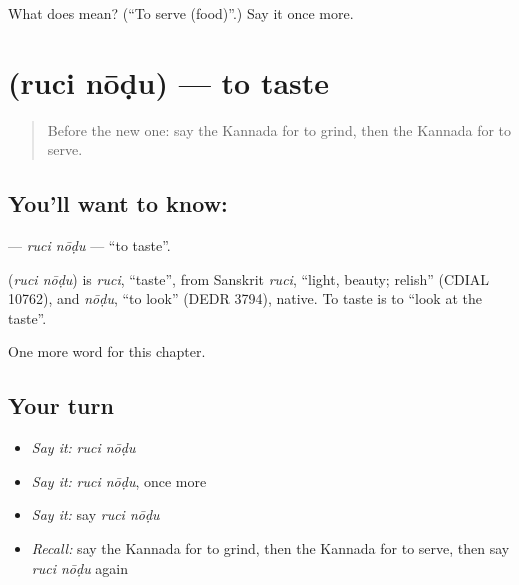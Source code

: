 \begin{tcolorbox}[breakable,colback=teal!4,colframe=teal!35!black,title={Before you move on}]
What does  mean? (\textquotedblleft{}To serve (food)\textquotedblright{}.) Say it once more.
\end{tcolorbox}
\section[\texorpdfstring{\kn{ರುಚಿ} \kn{ನೋಡು} (ruci nōḍu)}{ರುಚಿ ನೋಡು (ruci nōḍu)}]{  (ruci nōḍu) — to taste}

\label{lesson:KA-C159-ruci-nodu}



\begin{quote}
Before the new one: say the Kannada for to grind, then the Kannada for to serve.
\end{quote}

\subsection*{You'll want to know:  }
\textbf{ } — \emph{ruci nōḍu} — \textquotedblleft{}to taste\textquotedblright{}.

\begin{cousinweb}
\textbf{ } (\emph{ruci nōḍu}) is \emph{ruci}, \textquotedblleft{}taste\textquotedblright{}, from Sanskrit \emph{ruci}, \textquotedblleft{}light, beauty; relish\textquotedblright{} (CDIAL 10762), and \emph{nōḍu}, \textquotedblleft{}to look\textquotedblright{} (DEDR 3794), native. To taste is to \textquotedblleft{}look at the taste\textquotedblright{}.
\end{cousinweb}

\begin{grammarlens}[title={What you've built}]
One more word for this chapter.
\end{grammarlens}

\subsection*{Your turn}
\begin{itemize}
\raggedright
  \item \emph{Say it:} \emph{ruci nōḍu}
  \item \emph{Say it:} \emph{ruci nōḍu}, once more
  \item \emph{Say it:} say \emph{ruci nōḍu}
  \item \emph{Recall:} say the Kannada for to grind, then the Kannada for to serve, then say \emph{ruci nōḍu} again
\end{itemize}

